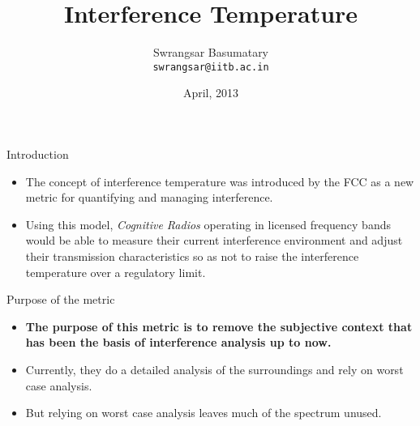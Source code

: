 \documentclass[mathserif]{beamer}
\title{Interference Temperature }
\author{Swrangsar Basumatary \\
\texttt{swrangsar@iitb.ac.in}}
\institute{Indian Institute of Technology Bombay}
\date{April, 2013}
\begin{document}
    \frame{\titlepage}

\begin{frame}{Introduction}

\begin{itemize}
	\pause
	\item The concept of interference temperature was introduced by the FCC as a new metric for quantifying and managing interference.
	\pause
	\item Using this model, \emph{Cognitive Radios} operating in licensed frequency bands would be able to measure their current interference environment and adjust their transmission characteristics so as not to raise the interference temperature over a regulatory limit.
\end{itemize}

%

\end{frame}

\begin{frame}{Purpose of the metric}

\begin{itemize}
	\pause 
	\item \textbf{The purpose of this metric is to remove the subjective context that has been the basis of interference analysis up to now.}
	\pause
	\item Currently, they do a  detailed analysis of the surroundings and rely on worst case analysis.
	
	
	\item But relying on worst case analysis leaves much of the spectrum unused. 
\end{itemize}

\end{frame}
\end{document}
